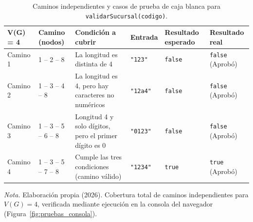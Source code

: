 \begin{table}[H]
  \centering
  \small
  \caption{Caminos independientes y casos de prueba de caja blanca para \protect\texttt{validarSucursal(codigo)}.}
  \label{tab:pruebas_caminos_blanca}
  \begin{tabularx}{\linewidth}{|C{1.8cm}|C{2.9cm}|Y|C{1.6cm}|C{1.9cm}|C{1.9cm}|}
    \hline
    \textbf{V(G) = 4} & \textbf{Camino (nodos)} & \textbf{Condición a cubrir} & \textbf{Entrada} & \textbf{Resultado esperado} & \textbf{Resultado real} \\ \hline
    Camino 1 & 1 -- 2 -- 8 & La longitud es distinta de 4 & \texttt{"123"} & \texttt{false} & \texttt{false} (Aprobó) \\ \hline
    Camino 2 & 1 -- 3 -- 4 -- 8 & La longitud es 4, pero hay caracteres no numéricos & \texttt{"12a4"} & \texttt{false} & \texttt{false} (Aprobó) \\ \hline
    Camino 3 & 1 -- 3 -- 5 -- 6 -- 8 & Longitud 4 y solo dígitos, pero el primer dígito es 0 & \texttt{"0123"} & \texttt{false} & \texttt{false} (Aprobó) \\ \hline
    Camino 4 & 1 -- 3 -- 5 -- 7 -- 8 & Cumple las tres condiciones (camino válido) & \texttt{"1234"} & \texttt{true} & \texttt{true} (Aprobó) \\ \hline
  \end{tabularx}
  \par\vspace{0.2cm}
  {\raggedright \small \emph{Nota.} Elaboración propia (2026). Cobertura total de caminos independientes para $V(G)=4$, verificada mediante ejecución en la consola del navegador (Figura~\ref{fig:pruebas_consola}).\par}
\end{table}

